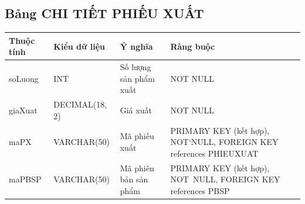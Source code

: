 \documentclass[a4paper,12pt]{report}
\begin{document}
\subsection{Bảng CHI TIẾT PHIẾU XUẤT}
\noindent
\begin{center}
    \begin{tabular}{|>{\centering\arraybackslash}p{3cm}|
        >{\centering\arraybackslash}p{4cm}|
        >{\centering\arraybackslash}p{4cm}|
        >{\centering\arraybackslash}p{4cm}|}
        \hline
        \textbf{Thuộc tính}                                                                                                               &
        \textbf{Kiểu dữ liệu}                                                                                                                             &
        \textbf{Ý nghĩa}                                                                                                 &
        \textbf{Ràng buộc}                                                                                                         \\
        \hline
        soLuong &  INT  & Số lượng sản phẩm xuất & NOT NULL \\
        \hline
        giaXuat &  DECIMAL(18, 2)  & Giá xuất & NOT NULL \\                                                                                                                          
        \hline
        maPX &  VARCHAR(50)  & Mã phiếu xuất & PRIMARY KEY (kết hợp), NOT`NULL, FOREIGN KEY references PHIEUXUAT \\
        \hline
        maPBSP & VARCHAR(50) & Mã phiên bản sản phẩm & PRIMARY KEY (kết hợp), NOT~NULL, FOREIGN KEY references PBSP \\                                                                                                                          
        \hline
    \end{tabular}
\end{center}
\end{document}
